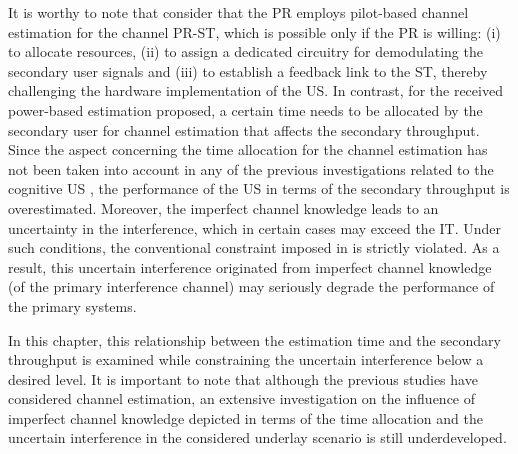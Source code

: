 It is worthy to note that \cite{Musa09, Suraweera10, Kim12, Alou12, Stat12, Alou13, Zhang13, Smith13, Li13, Kerr14} consider that the PR employs pilot-based channel estimation for the channel PR-ST, which is possible only if the PR is willing: (i) to allocate resources, (ii) to assign a dedicated circuitry for demodulating the secondary user signals and (iii) to establish a feedback link to the ST, thereby challenging the hardware implementation of the US. In contrast, for the received power-based estimation proposed, a certain time needs to be allocated by the secondary user for channel estimation that affects the secondary throughput. Since the aspect concerning the time allocation for the channel estimation has not been taken into account in any of the previous investigations related to the cognitive US \cite{Musa09, Suraweera10, Kim12, Alou12, Stat12, Alou13, Zhang13, Smith13, Li13, Kerr14}, the performance of the US in terms of the secondary throughput is overestimated. Moreover, the imperfect channel knowledge leads to an uncertainty in the interference, which in certain cases may exceed the IT. Under such conditions, the conventional constraint imposed in \cite{Xing07, Ghasemi07, Kang09, Musa09_} is strictly violated. As a result, this uncertain interference originated from imperfect channel knowledge (of the primary interference channel) may seriously degrade the performance of the primary systems. 


 In this chapter, this relationship between the estimation time and the secondary throughput is examined while constraining the uncertain interference below a desired level. It is important to note that although the previous studies have considered channel estimation, an extensive investigation on the influence of imperfect channel knowledge depicted in terms of the time allocation and the uncertain interference in the considered underlay scenario is still underdeveloped.
 


